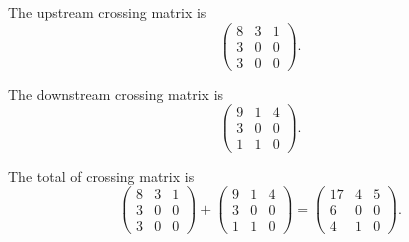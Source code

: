 \begin{Exercise}
\begin{solution}
The upstream crossing matrix is
$$
\begin{pmatrix}
8 & 3 & 1 \\
3 & 0 & 0 \\
3 & 0 & 0
\end{pmatrix}.
$$

The downstream crossing matrix is
$$
\begin{pmatrix}
9 & 1 & 4 \\
3 & 0 & 0 \\
1 & 1 & 0
\end{pmatrix}.
$$

The total of crossing matrix is
$$
\begin{pmatrix}
8 & 3 & 1 \\
3 & 0 & 0 \\
3 & 0 & 0
\end{pmatrix}
+ \begin{pmatrix}
9 & 1 & 4 \\
3 & 0 & 0 \\
1 & 1 & 0
\end{pmatrix}
= \begin{pmatrix}
17 & 4 & 5 \\
6 & 0 & 0 \\
4 & 1 & 0
\end{pmatrix}.
$$
\end{solution}
\end{Exercise}